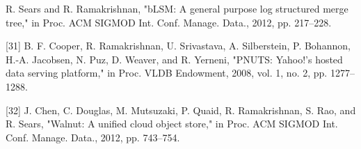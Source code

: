 \begin{flushleft}
[30] R. Sears and R. Ramakrishnan, "bLSM: A general purpose log structured merge tree," in Proc. ACM SIGMOD Int. Conf. Manage. Data., 2012, pp. 217–228.

[31] B. F. Cooper, R. Ramakrishnan, U. Srivastava, A. Silberstein, P. Bohannon, H.-A. Jacobsen, N. Puz, D. Weaver, and R. Yerneni, "PNUTS: Yahoo!’s hosted data serving platform," in Proc. VLDB Endowment, 2008, vol. 1, no. 2, pp. 1277–1288.

[32] J. Chen, C. Douglas, M. Mutsuzaki, P. Quaid, R. Ramakrishnan, S. Rao, and R. Sears, "Walnut: A unified cloud object store," in Proc. ACM SIGMOD Int. Conf. Manage. Data., 2012, pp. 743–754.

\end{flushleft}